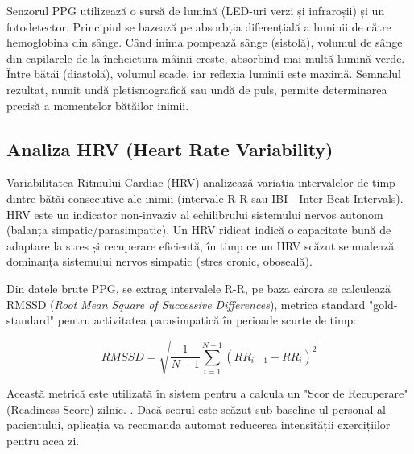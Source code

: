 \hspace{0.75cm}Senzorul PPG utilizează o sursă de lumină (LED-uri verzi și infraroșii) și un fotodetector.
Principiul se bazează pe absorbția diferențială a luminii de către hemoglobina din sânge. 
Când inima pompează sânge (sistolă), volumul de sânge din capilarele de la încheietura mâinii crește, absorbind mai multă lumină verde. 
Între bătăi (diastolă), volumul scade, iar reflexia luminii este maximă.
Semnalul rezultat, numit undă pletismografică sau undă de puls, permite determinarea precisă a momentelor bătăilor inimii.

\subsection{Analiza HRV (Heart Rate Variability)}
\hspace{0.75cm}Variabilitatea Ritmului Cardiac (HRV) analizează variația intervalelor de timp dintre bătăi consecutive ale inimii (intervale R-R sau IBI - Inter-Beat Intervals).
HRV este un indicator non-invaziv al echilibrului sistemului nervos autonom (balanța simpatic/parasimpatic).
Un HRV ridicat indică o capacitate bună de adaptare la stres și recuperare eficientă, în timp ce un HRV scăzut semnalează dominanța sistemului nervos simpatic (stres cronic, oboseală).

Din datele brute PPG, se extrag intervalele R-R, pe baza cărora se calculează RMSSD (\textit{Root Mean Square of Successive Differences}), metrica standard "gold-standard" pentru activitatea parasimpatică în perioade scurte de timp:

\begin{equation}
RMSSD = \sqrt{\frac{1}{N-1} \sum_{i=1}^{N-1} (RR_{i+1} - RR_i)^2}
\end{equation}

Această metrică este utilizată în sistem pentru a calcula un "Scor de Recuperare" (Readiness Score) zilnic. \cite{shaffer_ginsberg_2017}. 
Dacă scorul este scăzut sub baseline-ul personal al pacientului, aplicația va recomanda automat reducerea intensității exercițiilor 
pentru acea zi.
